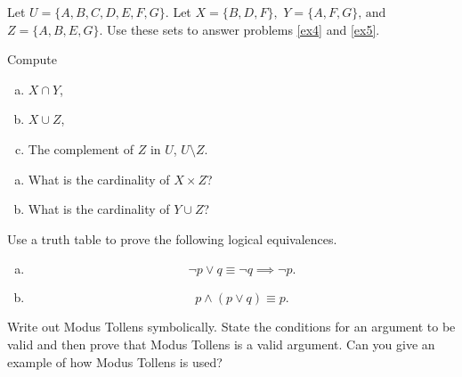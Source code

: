 \documentclass[12pt]{amsart}
\begin{document}
\noindent Let $U = \{A, B, C, D, E, F, G\}$.
Let 
$X = \{B, D, F\},$ 
$Y = \{A, F, G\},\, \text{and}$
$Z = \{A, B, E, G\}.$
Use these sets to answer problems \ref{ex4} and \ref{ex5}.
\begin{thm}[18 Points]\label{ex4}
  Compute
  \begin{enumerate}[(a)]
  \item
    $X \cap Y$,
    \vspace{2.5in}
  \item
    $X \cup Z$,
    \vspace{2.5in}
  \item
    The complement of $Z$ in $U$, $U \setminus Z$.
  \end{enumerate}
\end{thm}

\newpage

\begin{thm}[20 Points]\label{ex5}
  \begin{enumerate}[(a)]
  \item
    What is the cardinality of $X \times Z$?
    \vspace{4in}
  \item
    What is the cardinality of $Y \cup Z$?
  \end{enumerate}
\end{thm}

\newpage

\begin{thm}[20 Points]\label{ex9}
  Use a truth table to prove the following logical equivalences.
  \begin{enumerate}[(a)]
  \item
    $$\neg p \vee q \equiv \neg q \implies \neg p.$$
    \vspace{4in}
  \item
    $$p \wedge (p \vee q) \equiv p.$$
  \end{enumerate}
\end{thm}

\newpage

\begin{thm}\label{bonus}
  Write out Modus Tollens symbolically.
  State the conditions for an argument to be valid and then prove that Modus Tollens is a valid argument.
  Can you give an example of how Modus Tollens is used?
\end{thm}
\end{document}
